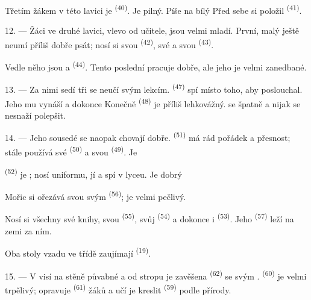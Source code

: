 Třetím žákem v této lavici je  \textsuperscript{(40)}. Je pilný. Píše na bílý
 Před sebe si položil  \textsuperscript{(41)}.

12. --- Žáci ve druhé lavici, vlevo od učitele, jsou velmi mladí. První, malý
 ještě neumí příliš dobře psát; nosí si svou  \textsuperscript{(42)}, své  a svou 
\textsuperscript{(43)}.

Vedle něho jsou  a  \textsuperscript{(44)}. Tento poslední
pracuje dobře, ale jeho  je velmi zanedbané.

13. --- Za nimi sedí tři  se neučí svým lekcím.
 \textsuperscript{(47)} spí místo toho, aby poslouchal. Jeho
 mu vynáší  a dokonce  Konečně
 \textsuperscript{(48)} je příliš lehkovážný.  se
špatně a nijak se nesnaží polepšit.

14. --- Jeho sousedé se naopak chovají dobře.  \textsuperscript{(51)} má rád
pořádek a přesnost; stále používá své
 \textsuperscript{(50)} a svou 
\textsuperscript{(49)}. Je 

 \textsuperscript{(52)} je ; nosí uniformu, jí a
spí v lyceu. Je dobrý 

Mořic si ořezává svou  svým  \textsuperscript{(56)}; je velmi
pečlivý.

Nosí si všechny své knihy, svou  \textsuperscript{(55)}, svůj
 \textsuperscript{(54)} a dokonce i 
\textsuperscript{(53)}. Jeho  \textsuperscript{(57)} leží na zemi za
ním.

Oba stoly vzadu ve třídě zaujímají  \textsuperscript{(19)}.

\VUsaut{4.6mm}
\VUsaut{3.4mm}

15. --- V  visí na stěně půvabné  a od stropu je zavěšena
 \textsuperscript{(62)} se svým .
 \textsuperscript{(60)} je velmi trpělivý; opravuje 
\textsuperscript{(61)} žáků a učí je kreslit  \textsuperscript{(59)} podle
přírody.


